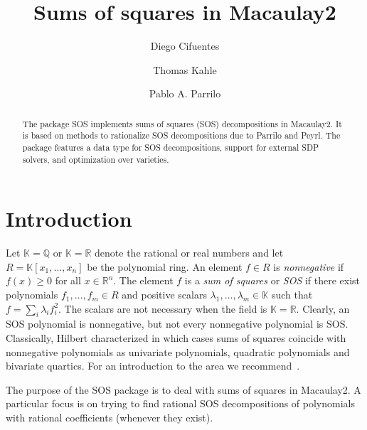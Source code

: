 \documentclass[11pt]{amsart}
\theoremstyle{plain}%
\theoremstyle{definition}
\theoremstyle{remark}
\newcommand{\Mac}{Macaulay2\xspace}
\newcommand{\SOS}{\textsc{SOS}\xspace}
\newcommand{\QQ}{\mathbb{Q}}
\newcommand{\RR}{\mathbb{R}}
\newcommand{\kk}{\mathbb{K}}
\begin{document}
\title[SOS.m2]{Sums of squares in \Mac}

\author{Diego Cifuentes}
\address{Massachusetts Institute of Technology \\ Cambridge, MA, USA}

\author{Thomas Kahle}
\address{Otto-von-Guericke University \\ Magdeburg, Germany}

\author{Pablo A. Parrilo}
\address{Massachusetts Institute of Technology \\ Cambridge, MA, USA}


\begin{abstract}
  The package \SOS implements sums of squares (SOS) decompositions in
  \Mac.
  It is based on methods to rationalize SOS decompositions due to Parrilo and Peyrl.
  The package features a data type for SOS decompositions, support for external SDP solvers, and optimization over varieties.
\end{abstract}

\maketitle

\section{Introduction}
\label{s:intro}

Let $\kk = \QQ$ or $\kk = \RR$ denote the rational or real numbers and let $R = \kk[x_{1},\dots,x_{n}]$ be the polynomial ring.  
An element $f\in R$ is \emph{nonnegative} if $f(x) \ge 0$ for all $x \in \RR^{n}$.  
The element $f$ is a \emph{sum of squares} or \emph{SOS} if there exist polynomials $f_{1},\dots,f_{m} \in R$ and positive scalars $\lambda_{1},\dots,\lambda_{m}\in \kk$ such that $f=\sum_{i}\lambda_i f_{i}^{2}$.
The scalars are not necessary when the field is $\kk=\RR$.
Clearly, an SOS polynomial is nonnegative, but not every nonnegative polynomial is SOS.
Classically, Hilbert characterized in which cases sums of squares coincide with nonnegative polynomials as univariate polynomials, quadratic polynomials and bivariate quartics.  
For an introduction to the area we recommend~\cite{scheiderer2009positivity,blekherman2012semidefinite}.

The purpose of the \SOS package is to deal with sums of squares in \Mac.
A particular focus is on trying to find rational SOS decompositions of polynomials with rational coefficients (whenever they exist).
\end{document}
